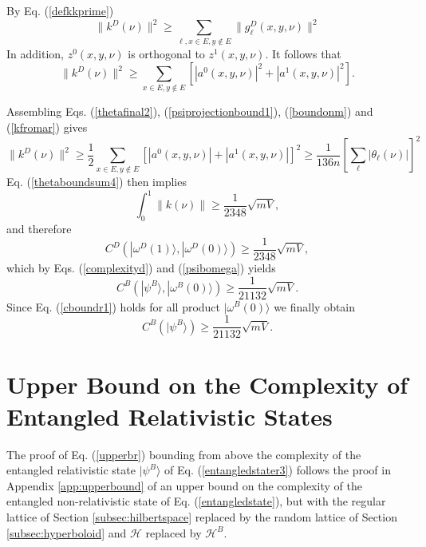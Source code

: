 \documentclass[12pt,amsmath,amssymb,onecolumn]{revtex4-2}
\begin{document}
By Eq. (\ref{defkkprime}) 
\begin{equation}
\label{kfroma0r}
\parallel k^D(\nu) \parallel ^ 2  \ge  \sum_{\ell, x \in E, y \notin E} \parallel g^D_\ell( x, y, \nu) \parallel^2
\end{equation}
In addition, $z^0(x,y,\nu)$ is orthogonal
to $z^1(x, y, \nu)$. It follows that
\begin{equation}
\label{kfromar}
\parallel k^D(\nu) \parallel^2 \ge \sum_{x \in E, y \notin E} [|a^0(x,y,\nu)|^2 + |a^1(x,y,\nu)|^2].
\end{equation}

Assembling Eqs. (\ref{thetafinal2}), (\ref{psiprojectionbound1}), (\ref{boundonm})
and (\ref{kfromar}) gives
\begin{equation}
\label{kboundr}
\parallel k^D(\nu) \parallel^2 \ge \frac{1}{2} \sum_{x \in E, y \notin E} [|a^0(x,y,\nu)| + |a^1(x,y,\nu)|]^2
\ge \frac{1}{136 n} [\sum_{\ell} |\theta_{\ell}(\nu)|] ^ 2
\end{equation}
Eq. (\ref{thetaboundsum4}) then implies
\begin{equation}
\label{kbound1r}
\int_0^1 \parallel k(\nu) \parallel \ge \frac{1}{2348} \sqrt{mV},
\end{equation}
and therefore
\begin{equation}
\label{cboundr}
C^D( |\omega^D(1) \rangle , |\omega^D(0) \rangle ) \ge \frac{1}{2348}\sqrt{ mV},
\end{equation}
which by Eqs. (\ref{complexityd}) and (\ref{psibomega}) yields
\begin{equation}
\label{cboundr1}
C^B( |\psi^B \rangle , |\omega^B(0) \rangle ) \ge \frac{1}{21132}\sqrt{ mV}.
\end{equation}
Since Eq. (\ref{cboundr1}) holds for all product $|\omega^B(0) \rangle $
we finally obtain
\begin{equation}
\label{cbound2r}
C^B( |\psi^B \rangle ) \ge \frac{1}{21132} \sqrt{ mV}.
\end{equation}




\section{\label{app:upperboundr} Upper Bound on the Complexity of Entangled Relativistic States}

The proof of Eq. (\ref{upperbr}) bounding from above the
complexity of the entangled relativistic state $|\psi^B \rangle $ of Eq. (\ref{entangledstater3}) 
follows the proof in Appendix \ref{app:upperbound} of an upper bound
on the complexity of the entangled non-relativistic state of Eq. (\ref{entangledstate}),
but with the regular lattice of Section \ref{subsec:hilbertspace} replaced by
the random lattice of Section \ref{subsec:hyperboloid} and
$\mathcal{H}$ replaced by $\mathcal{H}^B$.
\end{document}
